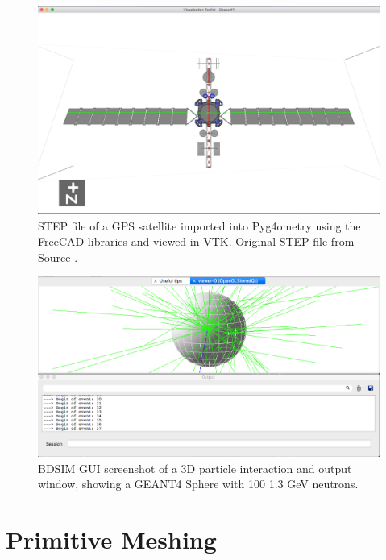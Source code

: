 \documentclass[12pt,a4paper]{article}
\begin{document}
\begin{figure}[h!]
\centering
\includegraphics[scale=0.4]{Images//VTK/sat.png}
\caption[width=\columnwidth]{STEP file of a GPS satellite imported into Pyg4ometry using the FreeCAD libraries and viewed in VTK. Original STEP file from Source \cite{sat}.}
\label{sat}
\end{figure}

\begin{figure}[h!]
\centering
\includegraphics[scale=0.4]{Images//BDSIM//screengrab.png}
\caption[width=\columnwidth]{BDSIM GUI screenshot of a 3D particle interaction and output window, showing a GEANT4 Sphere with 100 1.3 GeV neutrons.}
\label{screengrab}
\end{figure}


\newpage
\section{Primitive Meshing}
\label{prim}
\end{document}
